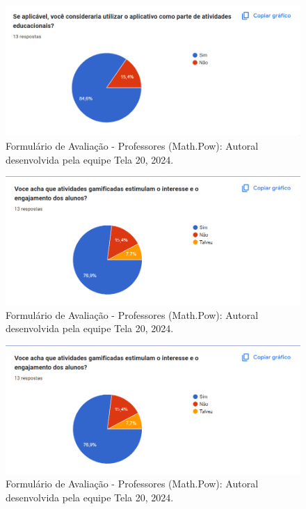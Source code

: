 \documentclass[12pt, openany, oneside, a4paper, english, brazil]{abntex2}   %
\begin{document}
\begin{figure}
    \centering
    \includegraphics{figuras/Formulário Gráficos/Professores/11 se aplicavel voce consideraria.png}
    \caption{Formulário de Avaliação - Professores (Math.Pow):  Autoral desenvolvida pela equipe Tela 20, 2024.}
    \label{gráfico gerado pelo formulário}
\end{figure}

\begin{figure}
    \centering
    \includegraphics{figuras/Formulário Gráficos/Professores/12 Voce acha que atividades gamificadas estimulam.png}
    \caption{Formulário de Avaliação - Professores (Math.Pow):  Autoral desenvolvida pela equipe Tela 20, 2024.}
    \label{gráfico gerado pelo formulário}
\end{figure}

\begin{figure}
    \centering
    \includegraphics{figuras/Formulário Gráficos/Professores/12 Voce acha que atividades gamificadas estimulam.png}
    \caption{Formulário de Avaliação - Professores (Math.Pow):  Autoral desenvolvida pela equipe Tela 20, 2024.}
    \label{gráfico gerado pelo formulário}
\end{figure}
\end{document}
